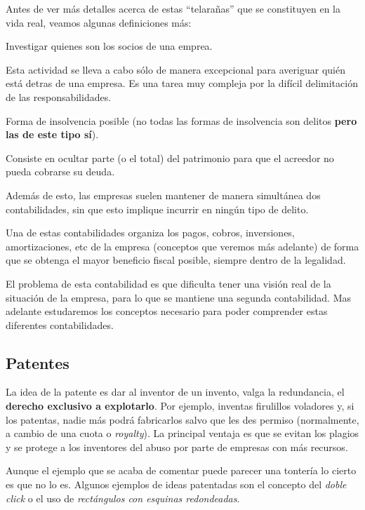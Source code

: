 \documentclass[nochap,palatino,shortheader]{apuntes}
\begin{document}
Antes de ver más detalles acerca de estas ``telarañas'' que se constituyen en la vida real, veamos algunas definiciones más:

\begin{defn}
Investigar quienes son los socios de una emprea.

Esta actividad se lleva a cabo sólo de manera excepcional para averiguar quién está detras de una empresa. Es una tarea muy compleja por la difícil delimitación de las responsabilidades.
\end{defn}

\begin{defn}
Forma de insolvencia posible (no todas las formas de insolvencia son delitos \textbf{pero las de este tipo sí}).

Consiste en ocultar parte (o el total) del patrimonio para que el acreedor no pueda cobrarse su deuda.
\end{defn}

Además de esto, las empresas suelen mantener de manera simultánea dos contabilidades, sin que esto implique incurrir en ningún tipo de delito.

Una de estas contabilidades organiza los pagos, cobros, inversiones, amortizaciones, etc de la empresa (conceptos que veremos más adelante) de forma que se obtenga el mayor beneficio fiscal posible, siempre dentro de la legalidad.

El problema de esta contabilidad es que dificulta tener una visión real de la situación de la empresa, para lo que se mantiene una segunda contabilidad. Mas adelante estudaremos los conceptos necesario para poder comprender estas diferentes contabilidades.


\subsection{Patentes}

La idea de la patente es dar al inventor de un invento, valga la redundancia, el \textbf{derecho exclusivo a explotarlo}. Por ejemplo, inventas firulillos voladores y, si los patentas, nadie más podrá fabricarlos salvo que les des permiso (normalmente, a cambio de una cuota o \textit{royalty}). La principal ventaja es que se evitan los plagios y se protege a los inventores del abuso por parte de empresas con más recursos.

Aunque el ejemplo que se acaba de comentar puede parecer una tontería lo cierto es que no lo es. Algunos ejemplos de ideas patentadas son el concepto del \textit{doble click} o el uso de \textit{rectángulos con esquinas redondeadas}.
\end{document}
